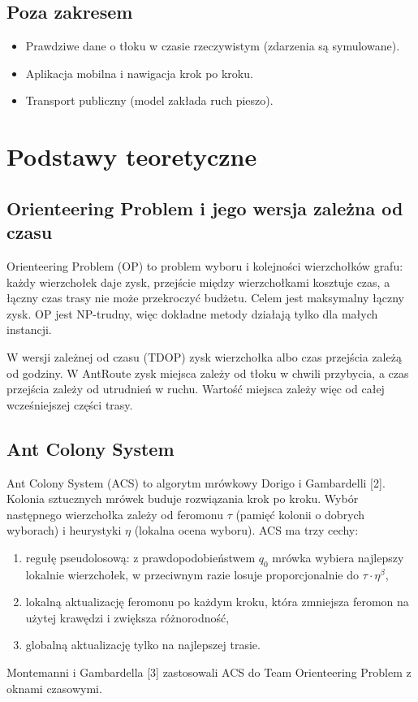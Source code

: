 \documentclass[11pt,a4paper]{article}
\begin{document}
\subsection{Poza zakresem}

\begin{itemize}
  \item Prawdziwe dane o tłoku w czasie rzeczywistym (zdarzenia są symulowane).
  \item Aplikacja mobilna i nawigacja krok po kroku.
  \item Transport publiczny (model zakłada ruch pieszo).
\end{itemize}

\section{Podstawy teoretyczne}

\subsection{Orienteering Problem i jego wersja zależna od czasu}

Orienteering Problem (OP) to problem wyboru i kolejności wierzchołków grafu: każdy wierzchołek daje zysk, przejście między wierzchołkami kosztuje czas, a łączny czas trasy nie może przekroczyć budżetu. Celem jest maksymalny łączny zysk. OP jest NP-trudny, więc dokładne metody działają tylko dla małych instancji.

W wersji zależnej od czasu (TDOP) zysk wierzchołka albo czas przejścia zależą od godziny. W AntRoute zysk miejsca zależy od tłoku w chwili przybycia, a czas przejścia zależy od utrudnień w ruchu. Wartość miejsca zależy więc od całej wcześniejszej części trasy.

\subsection{Ant Colony System}

Ant Colony System (ACS) to algorytm mrówkowy Dorigo i Gambardelli [2]. Kolonia sztucznych mrówek buduje rozwiązania krok po kroku. Wybór następnego wierzchołka zależy od feromonu $\tau$ (pamięć kolonii o dobrych wyborach) i heurystyki $\eta$ (lokalna ocena wyboru). ACS ma trzy cechy:
\begin{enumerate}
  \item regułę pseudolosową: z prawdopodobieństwem $q_0$ mrówka wybiera najlepszy lokalnie wierzchołek, w przeciwnym razie losuje proporcjonalnie do $\tau \cdot \eta^\beta$,
  \item lokalną aktualizację feromonu po każdym kroku, która zmniejsza feromon na użytej krawędzi i zwiększa różnorodność,
  \item globalną aktualizację tylko na najlepszej trasie.
\end{enumerate}
Montemanni i Gambardella [3] zastosowali ACS do Team Orienteering Problem z oknami czasowymi.
\end{document}

